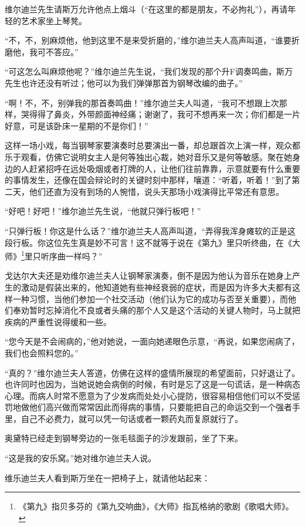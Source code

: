 \par 维尔迪兰先生请斯万允许他点上烟斗（“在这里的都是朋友，不必拘礼”），再请年轻的艺术家坐上琴凳。
\par “不，不，别麻烦他，他到这里不是来受折磨的，”维尔迪兰夫人高声叫道，“谁要折磨他，我可不答应。”
\par “可这怎么叫麻烦他呢？”维尔迪兰先生说，“我们发现的那个升F调奏鸣曲，斯万先生也许还没有听过；他可以为我们弹弹那首为钢琴改编的曲子。”
\par “啊！不，不，别弹我的那首奏鸣曲！”维尔迪兰夫人叫道，“我可不想跟上次那样，哭得得了鼻炎，外带颜面神经痛；谢谢了，我可不想再来一次；你们都是一片好意，可是该卧床一星期的不是你们！”
\par 这样一场小戏，每当钢琴家要演奏时总要演出一番，却总跟首次上演一样，观众都乐于观看，仿佛它说明女主人是何等独出心裁，她对音乐又是何等敏感。聚在她身边的人赶紧招呼在远处吸烟或者打牌的人，让他们往前靠靠，示意就要有什么重要的事情发生，还像在国会辩论时的关键时刻中那样，嚷道：“听着，听着！”到了第二天，他们还直为没有到场的人惋惜，说头天那场小戏演得比平常还有意思。
\par “好吧！好吧！”维尔迪兰先生说，“他就只弹行板吧！”
\par “只弹行板！你这是什么话？”维尔迪兰夫人高声叫道，“弄得我浑身瘫软的正是这段行板。你这位先生真是妙不可言！这不就等于说在《第九》里只听终曲，在《大师》\footnote{《第九》指贝多芬的《第九交响曲》，《大师》指瓦格纳的歌剧《歌唱大师》。}里只听序曲一样吗？”
\par 戈达尔大夫还是劝维尔迪兰夫人让钢琴家演奏，倒不是因为他认为音乐在她身上产生的激动是假装出来的，他知道她有些神经衰弱的症状，而是因为许多大夫都有这样一种习惯，当他们参加一个社交活动（他们认为它的成功与否至关重要），而他们奉劝暂时忘掉消化不良或者头痛的那个人又是这个活动的关键人物时，马上就把疾病的严重性说得缓和一些。
\par “您今天是不会闹病的，”他对她说，一面向她递眼色示意，“再说，如果您闹病了，我们也会照料您的。”
\par “真的？”维尔迪兰夫人答道，仿佛在这样的盛情所展现的希望面前，只好退让了。也许同时也因为，当她说她会病倒的时候，有时是忘了这是一句谎话，是一种病态心理。而病人时常不愿意为了少发病而处处小心提防，很容易相信他们可以不受惩罚地做他们高兴做而常常因此而得病的事情，只要能把自己的命运交到一个强者手里，自己不必费力，就可以凭一句话或者一颗药丸而复原就行了。
\par 奥黛特已经走到钢琴旁边的一张毛毯面子的沙发跟前，坐了下来。
\par “这是我的安乐窝。”她对维尔迪兰夫人说。
\par 维乐迪兰夫人看到斯万坐在一把椅子上，就请他站起来：
